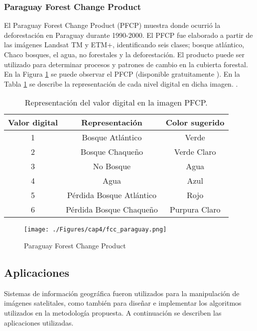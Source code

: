\subsubsection{Paraguay Forest Change Product}\label{sec:fcc}
El Paraguay Forest Change Product (PFCP) muestra donde ocurri\'o la deforestaci\'on en Paraguay durante 1990-2000. El PFCP fue elaborado a partir de las im\'agenes Landsat TM y ETM+, identificando seis clases; bosque atl\'antico, Chaco bosques, el agua, no forestales y la deforestaci\'on. El producto puede ser utilizado para determinar procesos y patrones de cambio en la cubierta forestal. En la Figura \ref{fig:fcc} se puede observar el PFCP (disponible gratuitamente \cite{gl2015Uni}). En la Tabla \ref{t:pfcptab} se describe la representaci\'on de cada nivel digital en dicha imagen. .
\begin{table}[htbp]\centering
\begin{tabular}{|c|c|c|}
	\hline \textbf{Valor digital} &\textbf{ Representaci\'on} & \textbf{Color sugerido} \\ 
	\hline 1 & Bosque Atl\'antico & Verde \\ 
	\hline 2 & Bosque Chaque\~{n}o & Verde Claro \\ 
	\hline 3 & No Bosque & Agua \\ 
	\hline 4 & Agua & Azul \\ 
	\hline 5 & P\'erdida Bosque Atl\'antico & Rojo \\ 
	\hline 6 & P\'erdida Bosque Chaque\~{n}o & Purpura Claro \\ 
	\hline 
\end{tabular} 
\caption{Representaci\'on del valor digital en la imagen PFCP.}
\label{t:pfcptab}
\end{table}

\begin{figure}[H]
	\centering
	\texttt{[image: ./Figures/cap4/fcc\_paraguay.png]}
	\caption{Paraguay Forest Change Product}
	\label{fig:fcc}
\end{figure}



\subsection{Aplicaciones}
Sistemas de informaci\'on geogr\'afica fueron utilizados para la manipulaci\'on de im\'agenes satelitales, como tambi\'en para dise\~{n}ar e implementar los algoritmos utilizados en la metodolog\'ia propuesta. A continuaci\'on se describen las aplicaciones utilizadas.

